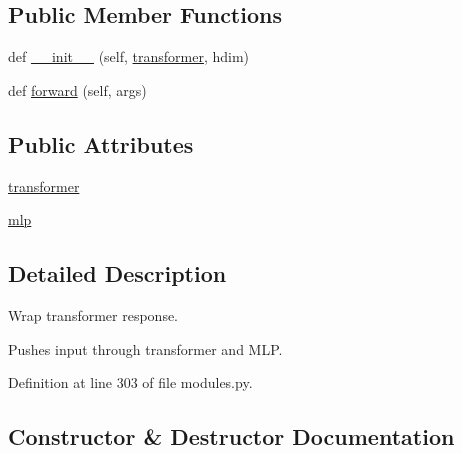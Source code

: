 \subsection*{Public Member Functions}
\begin{DoxyCompactItemize}
\item 
def \hyperlink{classparlai_1_1agents_1_1transformer_1_1modules_1_1TransformerResponseWrapper_ab078bf40bb275ebd56b4e205923ab827}{\+\_\+\+\_\+init\+\_\+\+\_\+} (self, \hyperlink{classparlai_1_1agents_1_1transformer_1_1modules_1_1TransformerResponseWrapper_ae757bd573993a3ca4a31e9d65b1a7e9a}{transformer}, hdim)
\item 
def \hyperlink{classparlai_1_1agents_1_1transformer_1_1modules_1_1TransformerResponseWrapper_ad716cb3a5874f46b1aa4beb45ba1b944}{forward} (self, args)
\end{DoxyCompactItemize}
\subsection*{Public Attributes}
\begin{DoxyCompactItemize}
\item 
\hyperlink{classparlai_1_1agents_1_1transformer_1_1modules_1_1TransformerResponseWrapper_ae757bd573993a3ca4a31e9d65b1a7e9a}{transformer}
\item 
\hyperlink{classparlai_1_1agents_1_1transformer_1_1modules_1_1TransformerResponseWrapper_a11ccb5cd5d1b5236b08c904bdeb9e041}{mlp}
\end{DoxyCompactItemize}


\subsection{Detailed Description}
\begin{DoxyVerb}Wrap transformer response.

Pushes input through transformer and MLP.
\end{DoxyVerb}
 

Definition at line 303 of file modules.\+py.



\subsection{Constructor \& Destructor Documentation}
\mbox{\label{classparlai_1_1agents_1_1transformer_1_1modules_1_1TransformerResponseWrapper_ab078bf40bb275ebd56b4e205923ab827}} 
